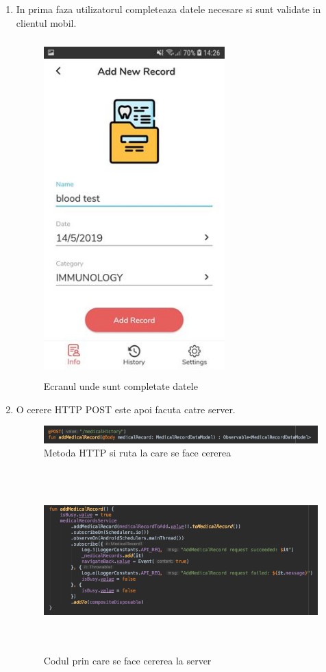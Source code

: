 \documentclass[12pt]{article}
\begin{document}
\begin{enumerate}
    \item In prima faza utilizatorul completeaza datele necesare si sunt validate
    in clientul mobil.

    \begin{figure}[H]
        \centering
        \includegraphics[width=7cm, height=13cm]{addNewRecord.jpg}
        \caption{Ecranul unde sunt completate datele}
        \end{figure}

    
    \item O cerere HTTP POST este apoi facuta catre server.
    
    \begin{figure}[H]
        \centering
        \includegraphics[width=15cm]{addMethod.png}
        \caption{Metoda HTTP si ruta la care se face cererea}
        \end{figure}

        \begin{figure}[H]
            \centering
            \includegraphics[width=15cm, height=7cm]{addRequest.png}
            \caption{Codul prin care se face cererea la server}
            \end{figure}



\end{enumerate}
\end{document}
